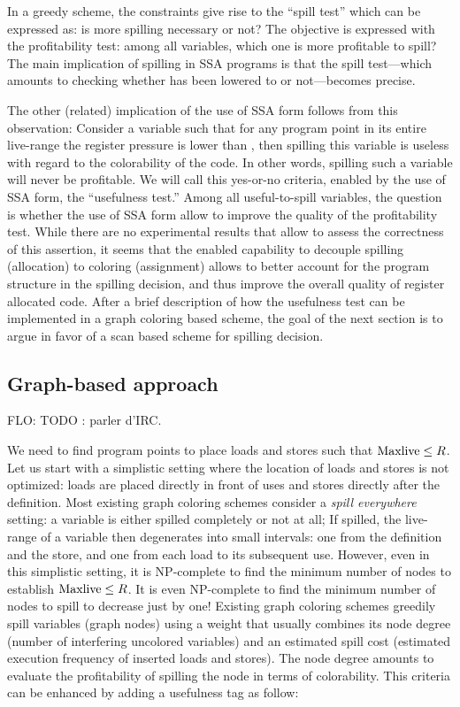 {In a greedy scheme, the constraints give rise to the ``spill test'' which can be expressed as: 
is more spilling necessary or not? 
The objective is expressed with the profitability test: 
among all variables, which one is more profitable to spill? 
The main implication of spilling in SSA programs is that the spill test---which amounts to checking whether \maxlive has been lowered to \regs or not---becomes precise. 

The other (related) implication of the use of SSA form follows from this observation: 
Consider a variable such that for any program point in its entire live-range the register pressure is lower than \regs, then spilling this variable is useless with regard to the colorability of the code.
In other words, spilling such a variable will never be profitable. 
We will call this yes-or-no criteria, enabled by the use of SSA form, the ``usefulness test.''
Among all useful-to-spill variables, the question is whether the use of SSA form allow to improve the quality of the profitability test.
While there are no experimental results that allow to assess the correctness of this assertion, it seems that the enabled capability to decouple spilling  (allocation) to coloring (assignment) allows to better account for the program structure in the spilling decision, and thus improve the overall quality of register allocated code.
After a brief description of how the usefulness test can be implemented in a graph coloring based scheme, the goal of the next section is to argue in favor of a scan based scheme for spilling decision.

\subsection{Graph-based approach}

FLO: TODO : parler d'IRC.

We need to find program points to place loads and stores such that $\mathrm{Maxlive}\le R$.
Let us start with a simplistic setting where the location of loads and stores is not optimized:
loads are placed directly in front of uses and stores directly after the definition.
Most existing graph coloring schemes consider a \emph{spill everywhere} setting:
a variable is either spilled completely or not at all;
If spilled, the live-range of a variable then degenerates into small intervals: one from the definition and the store, and one from each load to its subsequent use.
However, even in this simplistic setting, it is NP-complete to find the minimum number of nodes to establish $\mathrm{Maxlive}\le R$.
It is even NP-complete to find the minimum number of nodes to spill to decrease \maxlive just by one!
Existing graph coloring schemes greedily spill variables (graph nodes) using a weight that usually combines its node degree (number of interfering uncolored variables) and an estimated spill cost (estimated execution frequency of inserted loads and stores).
The node degree amounts to evaluate the profitability of spilling the node in terms of colorability.
This criteria can be enhanced by adding a usefulness tag as follow:

}
